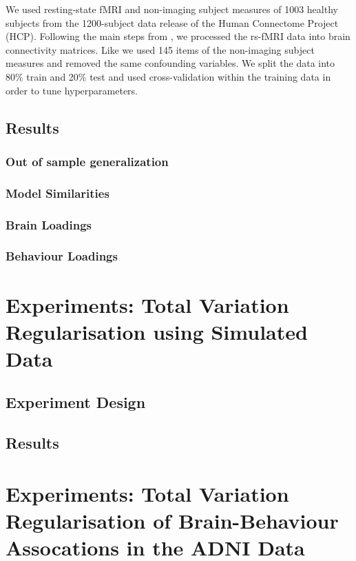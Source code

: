 We used resting-state fMRI and non-imaging subject measures of 1003 healthy subjects from the 1200-subject data release of the Human Connectome Project (HCP). Following the main steps from \cite{smith2015positive}, we processed the rs-fMRI data into brain connectivity matrices. Like \cite{smith2015positive} we used 145 items of the non-imaging subject measures and removed the same confounding variables. We split the data into 80\% train and 20\% test and used cross-validation within the training data in order to tune hyperparameters.

\subsection{Results}

\subsubsection{Out of sample generalization}

\subsubsection{Model Similarities}

\subsubsection{Brain Loadings}

\subsubsection{Behaviour Loadings}

\section{Experiments: Total Variation Regularisation using Simulated Data}
\subsection{Experiment Design}
\subsection{Results}


\section{Experiments: Total Variation Regularisation of Brain-Behaviour Assocations in the ADNI Data}
